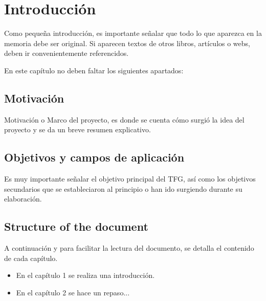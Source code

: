 \chapter{Introducción}

Como pequeña introducción, es importante señalar que todo lo que aparezca en la memoria debe ser original. Si aparecen textos de otros libros, artículos o webs, deben ir convenientemente referencidos.

En este capítulo no deben faltar los siguientes apartados:

\section{Motivación}

Motivación o Marco del proyecto, es donde se cuenta cómo surgió la idea del proyecto y se da un breve resumen explicativo.

\section{Objetivos y campos de aplicación}

Es muy importante señalar el objetivo principal del TFG, así como los objetivos secundarios que se estableciaron al principio o han ido surgiendo durante su elaboración.

\section{Structure of the document}

A continuación y para facilitar la lectura del documento, se detalla el contenido de cada capítulo.

\begin{itemize}
\item En el capítulo 1 se realiza una introducción.
\item En el capítulo 2 se hace un repaso...
\end{itemize}
